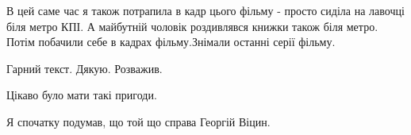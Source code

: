 \begin{itemize}

В цей саме час я також потрапила в кадр цього фільму - просто сиділа на лавочці
біля метро КПІ. А майбутній чоловік роздивлявся книжки також біля метро.
Потім побачили себе в кадрах фільму.Знімали останні серії фільму.

Гарний текст. Дякую. Розважив.

Цікаво було мати такі пригоди.

Я спочатку подумав, що той що справа Георгій Віцин.

\end{itemize} %
